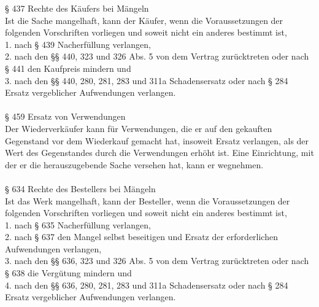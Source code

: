 \documentclass[12pt,titlepage]{report}
\begin{document}
§ 437 Rechte des Käufers bei Mängeln\\
Ist die Sache mangelhaft, kann der Käufer, wenn die Voraussetzungen der folgenden Vorschriften vorliegen und soweit nicht ein anderes bestimmt ist,\\
1.
nach § 439 Nacherfüllung verlangen,\\
2.
nach den §§ 440, 323 und 326 Abs. 5 von dem Vertrag zurücktreten oder nach § 441 den Kaufpreis mindern und\\
3.
nach den §§ 440, 280, 281, 283 und 311a Schadensersatz oder nach § 284 Ersatz vergeblicher Aufwendungen verlangen.\\\\

§ 459 Ersatz von Verwendungen\\
Der Wiederverkäufer kann für Verwendungen, die er auf den gekauften Gegenstand vor dem Wiederkauf gemacht hat, insoweit Ersatz verlangen, als der Wert des Gegenstandes durch die Verwendungen erhöht ist. Eine Einrichtung, mit der er die herauszugebende Sache versehen hat, kann er wegnehmen.\\\\

§ 634 Rechte des Bestellers bei Mängeln\\
Ist das Werk mangelhaft, kann der Besteller, wenn die Voraussetzungen der folgenden Vorschriften vorliegen und soweit nicht ein anderes bestimmt ist,\\
1.
nach § 635 Nacherfüllung verlangen,\\
2.
nach § 637 den Mangel selbst beseitigen und Ersatz der erforderlichen Aufwendungen verlangen,\\
3.
nach den §§ 636, 323 und 326 Abs. 5 von dem Vertrag zurücktreten oder nach § 638 die Vergütung mindern und\\
4.
nach den §§ 636, 280, 281, 283 und 311a Schadensersatz oder nach § 284 Ersatz vergeblicher Aufwendungen verlangen.
\end{document}
